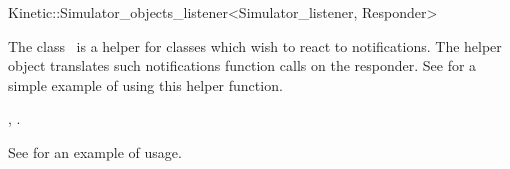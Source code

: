 

\begin{ccRefClass}{Kinetic::Simulator_objects_listener<Simulator_listener, Responder>}  %


\ccDefinition
  
The class \ccRefName\ is a helper for classes which wish to react to
 notifications. The helper
object translates such notifications  function calls
on the responder. See  for a
simple example of using this helper function.



\ccCreation
{}  %


\ccSeeAlso

,
.

\ccExample

See  for an example of usage.

\end{ccRefClass}


